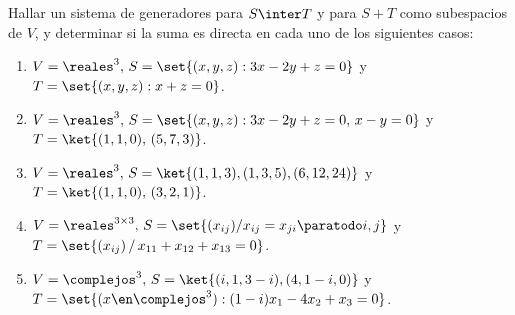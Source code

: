 \begin{enunciado}{\ejercicio}
  Hallar un sistema de generadores para $S \inter T$ y para $S + T$ como subespacios de $V$, y
  determinar si la suma es directa en cada uno de los siguientes casos:
  \begin{enumerate}[label=(\alph*)]
    \item $V = \reales^3,\, S = \set{(x,y,z) : 3x - 2y + z = 0}$ y $T = \set{(x, y ,z) : x + z =0}$.
    \item $V = \reales^3,\, S = \set{(x,y,z) : 3x - 2y + z = 0,\, x-y = 0}$ y $T = \ket{(1,1,0),\, (5,7,3)}$.
    \item $V = \reales^3,\, S = \ket{(1,1,3), (1,3,5), (6,12,24)}$ y $T = \ket{(1,1,0),\, (3,2,1)}$.
    \item $V = \reales^{3 \times 3},\, S = \set{(x_{ij}) / x_{ij} = x_{ji} \paratodo i, j}$ y $T = \set{(x_{ij})\, /\,  x_{11} + x_{12} + x_{13} = 0}$.
    \item $V = \complejos^3,\, S = \ket{(i, 1, 3-i), (4,1 - i, 0)}$ y $T = \set{(x \en \complejos^3) : (1 - i)x_1 - 4x_2 + x_3 = 0}$.
  \end{enumerate}
\end{enunciado}


